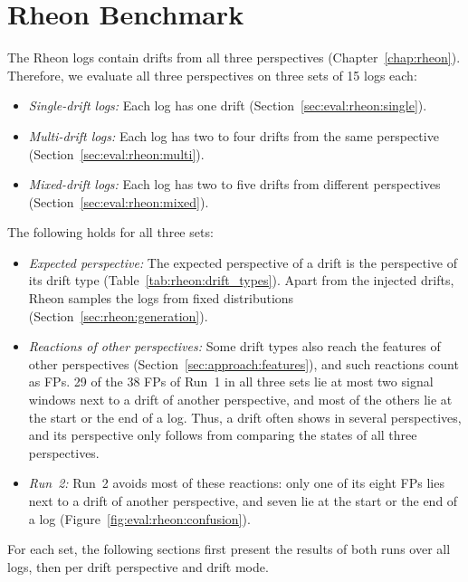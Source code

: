 \section{Rheon Benchmark}
\label{sec:eval:rheon}
The Rheon logs contain drifts from all three perspectives (Chapter~\ref{chap:rheon}). Therefore, we evaluate all three perspectives on three sets of 15 logs each:
\begin{itemize}
	\item \emph{Single-drift logs:} Each log has one drift (Section~\ref{sec:eval:rheon:single}).
	\item \emph{Multi-drift logs:} Each log has two to four drifts from the same perspective (Section~\ref{sec:eval:rheon:multi}).
	\item \emph{Mixed-drift logs:} Each log has two to five drifts from different perspectives (Section~\ref{sec:eval:rheon:mixed}).
\end{itemize}
The following holds for all three sets:
\begin{itemize}
	\item \emph{Expected perspective:} The expected perspective of a drift is the perspective of its drift type (Table~\ref{tab:rheon:drift_types}). Apart from the injected drifts, Rheon samples the logs from fixed distributions (Section~\ref{sec:rheon:generation}).
	\item \emph{Reactions of other perspectives:} Some drift types also reach the features of other perspectives (Section~\ref{sec:approach:features}), and such reactions count as FPs. 29 of the 38 FPs of Run~1 in all three sets lie at most two signal windows next to a drift of another perspective, and most of the others lie at the start or the end of a log. Thus, a drift often shows in several perspectives, and its perspective only follows from comparing the states of all three perspectives.
	\item \emph{Run~2:} Run~2 avoids most of these reactions: only one of its eight FPs lies next to a drift of another perspective, and seven lie at the start or the end of a log (Figure~\ref{fig:eval:rheon:confusion}).
\end{itemize}
For each set, the following sections first present the results of both runs over all logs, then per drift perspective and drift mode.


